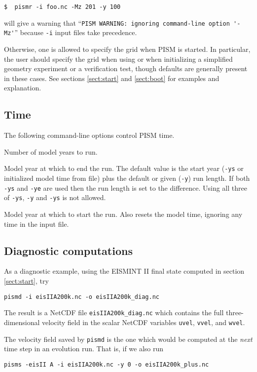 \verb|$  pismr -i foo.nc -Mz 201 -y 100|

\noindent will give a warning that ``\verb|PISM WARNING: ignoring command-line option '-Mz'|'' because \verb|-i| input files take precedence.

Otherwise, one is allowed to specify the grid when PISM is started.  In particular, the user should specify the grid when using  or when initializing a simplified geometry experiment or a verification test, though defaults are generally present in these cases.  See sections \ref{sect:start} and \ref{sect:boot} for examples and explanation.

\subsection{Time}
\label{sec:time}

The following command-line options control PISM time.

 Number of model years to run.

 Model year at which to end the run.  The default value is the start year  (\verb|-ys| or initialized model time from file) plus the default or given (\verb|-y|) run length.  If both \verb|-ys| and \verb|-ye| are used then the run length is set to the difference.  Using all three of \verb|-ys|, \verb|-y| and \verb|-ys| is not allowed.

 Model year at which to start the run.  Also resets the model time, ignoring any time in the input file.



\subsection{Diagnostic computations}  As a diagnostic example, using the EISMINT II final state computed in section \ref{sect:start}, try

\verb|pismd -i eisIIA200k.nc -o eisIIA200k_diag.nc|

\noindent The result is a NetCDF file \verb|eisIIA200k_diag.nc| which contains the full three-dimensional velocity field in the scalar NetCDF variables \verb|uvel|, \verb|vvel|, and \verb|wvel|.

The velocity field saved by \verb|pismd| is the one which would be computed at the \emph{next} time step in an evolution run.  That is, if we also run

\verb|pisms -eisII A -i eisIIA200k.nc -y 0 -o eisIIA200k_plus.nc|

